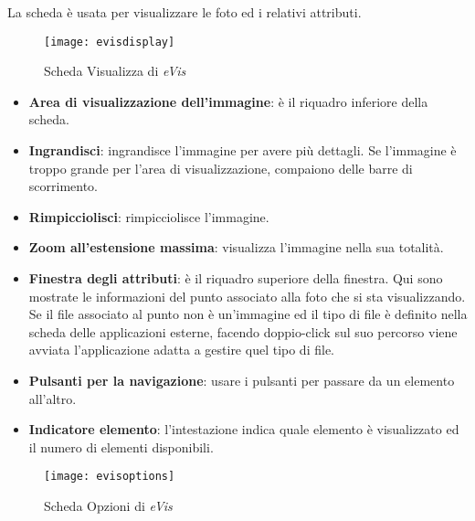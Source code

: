 \label{evis_display_window}

La scheda  è usata per visualizzare le foto ed i relativi attributi. 

\begin{figure}[ht]
   \centering
   \texttt{[image: evisdisplay]}
   \caption{Scheda Visualizza di \emph{eVis} \nixcaption}\label{evisdisplay}
\end{figure}

\begin{itemize}[label=--]
\item \textbf{Area di visualizzazione dell'immagine}: è il riquadro inferiore della scheda.
\item \textbf{Ingrandisci}: ingrandisce l'immagine per avere più dettagli. Se l'immagine è troppo 
grande per l'area di visualizzazione, compaiono delle barre di scorrimento.
\item \textbf{Rimpicciolisci}: rimpicciolisce l'immagine.
\item \textbf{Zoom all'estensione massima}: visualizza l'immagine nella sua totalità.
\item \textbf{Finestra degli attributi}: è il riquadro superiore della finestra. Qui sono mostrate 
le informazioni del punto associato alla foto che si sta visualizzando. Se il file associato al punto 
non è un'immagine ed il tipo di file è definito nella scheda delle applicazioni esterne, facendo 
doppio-click sul suo percorso viene avviata l'applicazione adatta a gestire quel tipo di file.  
\item \textbf{Pulsanti per la navigazione}: usare i pulsanti   per 
passare da un elemento all'altro.
\item \textbf{Indicatore elemento}: l'intestazione indica quale elemento è visualizzato ed il numero di
elementi disponibili.
\end{itemize}

\label{evis_options_window}

\begin{figure}[ht]
   \centering
   \texttt{[image: evisoptions]}
   \caption{Scheda Opzioni di \emph{eVis} \nixcaption}\label{evisoptions}
\end{figure}

